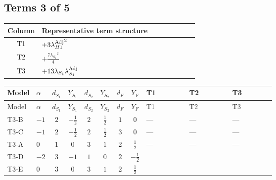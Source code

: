 \documentclass[8pt]{article}
\begin{document}
\begin{landscape}
\subsection*{Terms 3 of 5}
\begin{center}
\begin{tabular}{@{}c >{\raggedright\arraybackslash}p{0.82\linewidth}@{}}
\toprule
Column & Representative term structure \\
\midrule
T1 & \(\displaystyle +3 {\lambda_{H1}^{\rm Adj}}^2\) \\
\midrule
T2 & \(\displaystyle +\frac{7 {\lambda_{S_1}}^2}{4}\) \\
\midrule
T3 & \(\displaystyle +13 {\lambda_{S_1}} {\lambda_{S_1}^{\rm Adj}}\) \\
\midrule
\bottomrule
\end{tabular}
\end{center}
\smallskip
\tiny
\begin{longtable}{@{}llcccccc >{\raggedright\arraybackslash}p{0.21\linewidth} >{\raggedright\arraybackslash}p{0.21\linewidth} >{\raggedright\arraybackslash}p{0.21\linewidth}@{}}
\toprule
Model & $\alpha$ & $d_{S_1}$ & $Y_{S_1}$ & $d_{S_2}$ & $Y_{S_2}$ & $d_F$ & $Y_F$ & T1 & T2 & T3 \\
\midrule
\endfirsthead
\toprule
Model & $\alpha$ & $d_{S_1}$ & $Y_{S_1}$ & $d_{S_2}$ & $Y_{S_2}$ & $d_F$ & $Y_F$ & T1 & T2 & T3 \\
\midrule
\endhead
T3-B & $-1$ & $2$ & $-\frac{1}{2}$ & $2$ & $\frac{1}{2}$ & $1$ & $0$ & --- & --- & --- \\
\midrule
T3-C & $-1$ & $2$ & $-\frac{1}{2}$ & $2$ & $\frac{1}{2}$ & $3$ & $0$ & --- & --- & --- \\
\midrule
T3-A & $0$ & $1$ & $0$ & $3$ & $1$ & $2$ & $\frac{1}{2}$ & --- & --- & --- \\
\midrule
T3-D & $-2$ & $3$ & $-1$ & $1$ & $0$ & $2$ & $-\frac{1}{2}$ & \scriptsize\adjustbox{max width=\linewidth}{$\begin{gathered} +3 {\lambda_{H1}^{\rm Adj}}^2\end{gathered}$} & \scriptsize\adjustbox{max width=\linewidth}{$\begin{gathered} +\frac{7 {\lambda_{S_1}}^2}{4}\end{gathered}$} & \scriptsize\adjustbox{max width=\linewidth}{$\begin{gathered} +13 {\lambda_{S_1}} {\lambda_{S_1}^{\rm Adj}}\end{gathered}$} \\
\midrule
T3-E & $0$ & $3$ & $0$ & $3$ & $1$ & $2$ & $\frac{1}{2}$ & \scriptsize\adjustbox{max width=\linewidth}{$\begin{gathered} +3 {\lambda_{H1}^{\rm Adj}}^2\end{gathered}$} & \scriptsize\adjustbox{max width=\linewidth}{$\begin{gathered} +\frac{7 {\lambda_{S_1}}^2}{4}\end{gathered}$} & \scriptsize\adjustbox{max width=\linewidth}{$\begin{gathered} +13 {\lambda_{S_1}} {\lambda_{S_1}^{\rm Adj}}\end{gathered}$} \\
\midrule
\bottomrule
\end{longtable}
\clearpage

\end{landscape}
\end{document}
